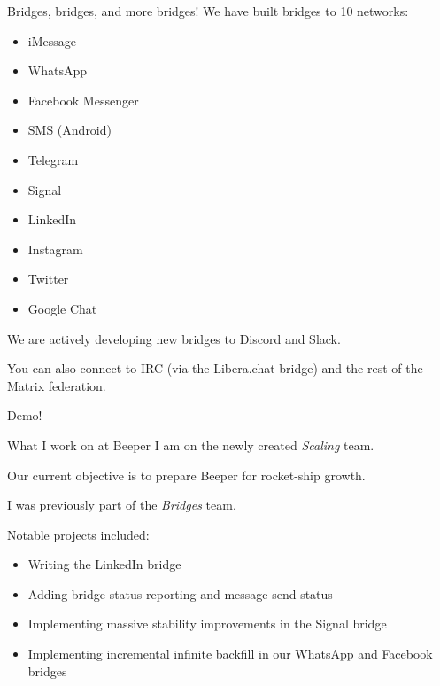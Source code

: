 \documentclass{beeper}
\begin{document}
\begin{frame}{Bridges, bridges, and more bridges!}
    We have built bridges to 10 networks:
    \begin{multicols}{2}
        \begin{itemize}
            \item iMessage
            \item WhatsApp
            \item Facebook Messenger
            \item SMS (Android)
            \item Telegram
            \item Signal
            \item LinkedIn
            \item Instagram
            \item Twitter
            \item Google Chat
        \end{itemize}
    \end{multicols}

    \pause
    We are actively developing new bridges to Discord and Slack.

    \pause
    You can also connect to IRC (via the Libera.chat bridge) and the rest of the
    Matrix federation.
\end{frame}

\begingroup
\def\insertframenumber{\relax}
\begin{frame}[standout]
    \Large
    Demo!
\end{frame}
\endgroup

\begin{frame}{What I work on at Beeper}
    I am on the newly created \textit{Scaling} team.

    Our current objective is to prepare Beeper for rocket-ship growth.
    \vspace{0.5cm}
    \pause

    I was previously part of the \textit{Bridges} team. 

    Notable projects included:
    \begin{itemize}
        \item Writing the LinkedIn bridge
        \item Adding bridge status reporting and message send status
        \item Implementing massive stability improvements in the Signal bridge
        \item Implementing incremental infinite backfill in our WhatsApp and
            Facebook bridges
    \end{itemize}
\end{frame}
\end{document}
